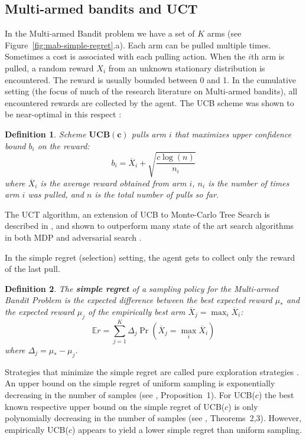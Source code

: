 \documentclass[letterpaper]{article}
\newcommand {\IE} {\ensuremath {\mathbb{E}}}
\newtheorem{dfn}{Definition}
\begin{document}
\subsection{Multi-armed bandits and UCT}

In the Multi-armed Bandit problem \cite{Vermorel.bandits} we have a set
of $K$ arms (see Figure~\ref{fig:mab-simple-regret}.a). Each arm can
be pulled multiple times. Sometimes a cost is
associated with each pulling action. When the $i$th arm
is pulled, a random reward $X_i$ from an unknown stationary
distribution is encountered.  The reward is usually bounded between 0 and 1.
In the cumulative setting (the focus of much of the research literature on Multi-armed bandits),
all encountered rewards are collected by the agent. 
The UCB scheme was shown to be near-optimal in this respect \cite{Auer.ucb}:

\begin{dfn} Scheme $\mathbf{UCB(c)}$ pulls arm $i$ that maximizes 
upper confidence bound $b_i$ on the reward:
\begin{equation}
b_i=\overline X_i+\sqrt {\frac {c \log (n)} {n_i}}
\label{eqn:ucb}
\end{equation}
where $\overline X_i$ is the average reward obtained from arm $i$,
$n_i$ is the number of times arm $i$ was pulled, and $n$ is the total
number of pulls so far. \end{dfn} 

The UCT algorithm, an extension of UCB
to Monte-Carlo Tree Search is described in \cite{Kocsis.uct}, and
shown to outperform many state of the art search algorithms in both
MDP and adversarial search \cite{Eyerich.ctp}. 

In the simple regret (selection) setting, the agent gets to
collect only the reward of the last pull.

\begin{dfn}
The \textbf{simple regret} of a sampling policy for the Multi-armed Bandit
Problem is the expected difference between the best expected reward
$\mu_*$ and the expected reward $\mu_j$ of the empirically best arm
$\overline X_j=\max_i\overline X_i$:
\begin{equation}
\IE r=\sum_{j=1}^K\Delta_j\Pr(\overline X_j=\max_i\overline X_i)
\label{eqn:simple-regret}
\end{equation}
where $\Delta_j=\mu_*-\mu_j$.
\end{dfn}

Strategies that minimize the simple regret are called pure exploration
strategies \cite{Bubeck.pure}. An upper bound on the simple regret of uniform sampling is
exponentially decreasing in the number of samples (see
\cite{Bubeck.pure}, Proposition~1). For UCB($c$) the best known respective upper bound on the simple
regret of UCB($c$) is only polynomially decreasing in the number of samples
(see \cite{Bubeck.pure}, Theorems~2,3). However, empirically
UCB($c$) appears to yield a lower simple regret than uniform
sampling. 
\end{document}

